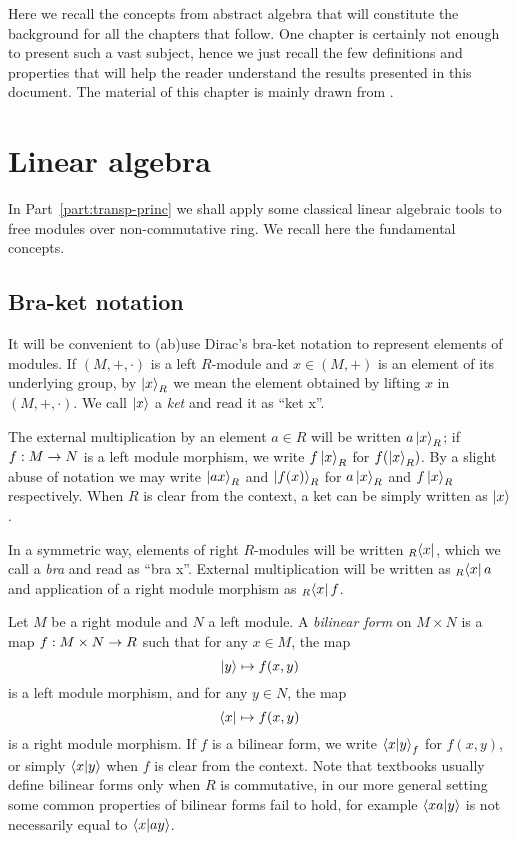 

Here we recall the concepts from abstract algebra that will constitute
the background for all the chapters that follow. One chapter is
certainly not enough to present such a vast subject, hence we just
recall the few definitions and properties that will help the reader
understand the results presented in this document. The material of
this chapter is mainly drawn from
\cite{lang,lidl+niederreiter:2,silverman:elliptic}.

\section{Linear algebra}
\label{sec:linear-algebra}
In Part~\ref{part:transp-princ} we shall apply some classical linear
algebraic tools to free modules over non-commutative ring. We recall
here the fundamental concepts.


\subsection{Bra-ket notation}
\label{sec:linear-algebra:bra-ket}

It will be convenient to (ab)use Dirac's
bra-ket notation to represent elements of
modules. If $(M,+,\cdot)$ is a left $R$-module and $x\in (M,+)$ is an
element of its underlying group, by $\left\lvert x \right\rangle_R$ we mean the element
obtained by lifting $x$ in $(M,+,\cdot)$. We call
$\left\lvert x \right\rangle$ a
\emph{ket} and read it as ``ket x''.

The external multiplication by an element $a\in R$ will be written
$a\left\lvert x \right\rangle_R$; if $f:M\rightarrow N$ is a left module morphism, we write
$f\left\lvert x \right\rangle_R$ for $f(\left\lvert x \right\rangle_R)$. By a slight abuse of notation we may
write $\left\lvert a x \right\rangle_R$ and $\left\lvert f(x) \right\rangle_R$ for $a\left\lvert x \right\rangle_R$ and
$f\left\lvert x \right\rangle_R$ respectively. When $R$ is clear from the context, a ket
can be simply written as $\left\lvert x \right\rangle$.

 In a
symmetric way, elements of right $R$-modules will be written
${}_R\!\left\langle x \right\rvert$, which we call a \emph{bra} and read as
``bra x''. External multiplication will be written as ${}_R\!\left\langle x \right\rvert a$
and application of a right module morphism as ${}_R\!\left\langle x \right\rvert f$.

Let $M$ be a right module and $N$ a left module. A
\emph{bilinear
  form} on
$M\times N$ is a map $f:M\times N\rightarrow R$ such that for any $x\in M$,
the map
\[\left\lvert y \right\rangle\mapsto f(x, y)\]
is a left module morphism, and for any $y\in N$, the map
\[\left\langle x \right\rvert\mapsto f(x, y)\]
is a right module morphism. If $f$ is a bilinear form, we write
$\left\langle x \middle| y \right\rangle_f$ for $f(x,y)$, or simply $\left\langle x \middle| y \right\rangle$ when $f$ is
clear from the context. Note that textbooks usually define bilinear
forms only when $R$ is commutative, in our more general setting some
common properties of bilinear forms fail to hold, for example
$\left\langle xa \middle| y \right\rangle$ is not necessarily equal to $\left\langle x \middle| ay \right\rangle$.

